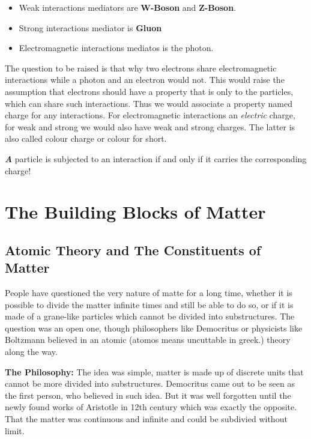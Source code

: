 \documentclass[10pt,a4paper]{article}
\newcounter{theo}
\newenvironment{callout}
	{\begin{calloutbox}\color{charcoal}\textbf\textit}
	{\end{calloutbox}}
\begin{document}
\begin{itemize}
     \item Weak interactions mediators are \textbf{W-Boson} and \textbf{Z-Boson}.
     \item Strong interactions mediator is \textbf{Gluon}
     \item Electromagnetic interactions mediatos is the photon.
\end{itemize}

The question to be raised is that why two electrons share electromagnetic interactions while a photon and an electron would not. This would raise the assumption that electrons should have a property that is only to the particles, which can share such interactions. Thus we would associate a property named charge for any interactions. For electromagnetic interactions an \textit{electric} charge, for weak and strong we would also have weak and strong charges. The latter is also called colour charge or colour for short.

\begin{callout}
     A particle is subjected to an interaction if and only if it carries the corresponding charge!
\end{callout}

\section{The Building Blocks of Matter}
\subsection{Atomic Theory and The Constituents of Matter}
People have questioned the very nature of matte for a long time, whether it is possible to divide the matter infinite times and still be able to do so, or if it is made of a grane-like particles which cannot be divided into substructures. The question was an open one, though philosophers like Democritus or physicists like Boltzmann believed in an atomic (atomos means uncuttable in greek.) theory along the way. 

\textbf{The Philosophy:} The idea was simple, matter is made up of discrete units that cannot be more divided into substructures. Democritus came out to be seen as the first person, who believed in such idea. But it was well forgotten until the newly found works of Aristotle in 12th century which was exactly the opposite. That the matter was continuous and infinite and could be subdivied without limit.
\end{document}
